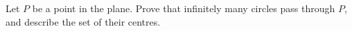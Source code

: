 Let $P$ be a point in the plane. Prove that infinitely many circles pass through $P$, and describe the set of their centres.
